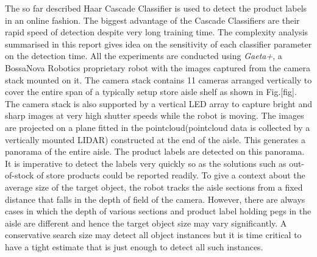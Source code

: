 The so far described Haar Cascade Classifier \cite{classifier3} is used to detect the product labels in an online fashion. The biggest advantage of the Cascade Classifiers are their rapid speed of detection despite very long training time. The complexity analysis summarised in this report gives idea on the sensitivity of each classifier parameter on the detection time. All the experiments are conducted using \textit{Gaeta+}, a BossaNova Robotics proprietary robot with the images captured from the camera stack mounted on it. The camera stack contains 11 cameras arranged vertically to cover the entire span of a typically setup store aisle shelf as shown in Fig.[fig]. The camera stack is also supported by a vertical LED array to capture bright and sharp images at very high shutter speeds while the robot is moving. The images are projected on a plane fitted in the pointcloud(pointcloud data is collected by a vertically mounted LIDAR) constructed at the end of the aisle. This generates a panorama of the entire aisle. The product labels are detected on this panorama. It is imperative to detect the labels very quickly so as the solutions such as out-of-stock of store products could be reported readily. To give a context about the average size of the target object, the robot tracks the aisle sections from a fixed distance that falls in the depth of field of the camera. However, there are always cases in which the depth of various sections and product label holding pegs in the aisle are different and hence the target object size may vary significantly. A conservative search size may detect all object instances but it is time critical to have a tight estimate that is just enough to detect all such instances.\\

